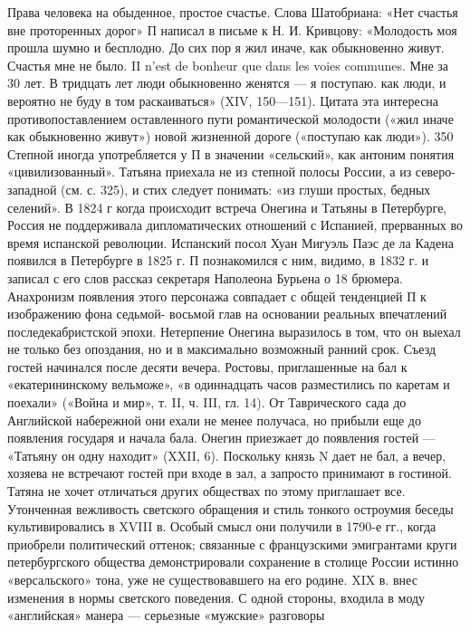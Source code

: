  \label{felicita}
Права человека на обыденное, простое счастье. Слова Шатобриана: «Нет счастья вне 
проторенных дорог» П  написал в письме к Н. И. Кривцову: «Молодость моя прошла 
шумно и бесплодно. До сих пор я жил иначе, как обыкновенно живут. 
Счастья мне не было. II n’est de bonheur que dans les voies communes. 
Мне за 30 лет. 
В тридцать лет люди обыкновенно женятся — я поступаю. как люди, и вероятно не буду в том раскаиваться» (XIV, 150—151). 
Цитата эта интересна противопоставлением оставленного пути романтической молодости («жил иначе как обыкновенно живут») 
новой жизненной дороге («поступаю как люди»).
350
\label{villaggio}
Степной иногда употребляется у П в значении «сельский», 
как антоним понятия «цивилизованный».
Татьяна приехала не из степной полосы России, а из северо-западной (см. с. 325), 
и стих следует понимать: «из глуши простых, бедных селений».
\label{spagna}
В 1824 г когда происходит встреча Онегина и Татьяны в Петербурге, 
Россия не поддерживала дипломатических отношений с Испанией, прерванных во время испанской революции. Испанский посол Хуан Мигуэль Паэс де ла Кадена появился в Петербурге в 1825 г. П познакомился с ним, 
видимо, в 1832 г. и записал с его слов рассказ секретаря Наполеона Бурьена о 18 брюмера.
Анахронизм появления этого персонажа совпадает с общей тенденцией П к изображению фона седьмой- восьмой глав на основании реальных впечатлений последекабристской эпохи.
\label{serata}
Нетерпение Онегина выразилось в том, что он выехал не только без опоздания,
но и в максимально возможный ранний срок. Съезд гостей начинался после десяти вечера. 
Ростовы, приглашенные на бал к «екатерининскому вельможе», «в одиннадцать часов разместились 
по каретам и поехали» («Война и мир», т. II, ч. III, гл. 14). От Таврического сада до Английской набережной они ехали не менее получаса, но прибыли еще до появления государя и начала бала.
Онегин приезжает до появления гостей — «Татьяну он одну находит» (XXII, 6).
Поскольку князь N дает не бал, а вечер, хозяева не встречают гостей при входе в зал, а запросто принимают 
в гостиной. 
\label{stupido}
 Татяна не хочет отличаться других обществах по этому приглашает все.
\label{scherzo}
Утонченная вежливость светского обращения и стиль тонкого остроумия беседы культивировались в XVIII в. 
Особый смысл они получили в 1790-е гг., когда приобрели политический оттенок;
связанные с французскими эмигрантами круги петербургского общества демонстрировали сохранение в столице России истинно 
«версальского» тона, уже не существовавшего на его родине. XIX в. внес изменения в нормы светского 
поведения. С одной стороны, входила в моду «английская» манера — серьезные «мужские» разговоры
